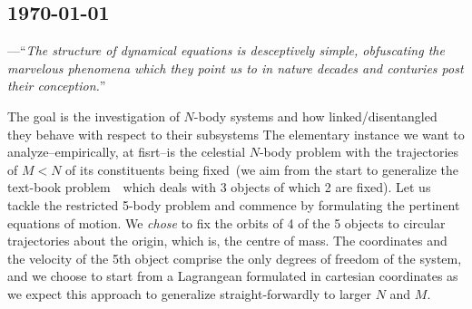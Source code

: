 \documentclass[]{article}
\newcommand{\tqt}[1]{\begin{flushleft}---\textquotedblleft\textit{#1}\textquotedblright\par\end{flushleft}}
\begin{document}
\begin{paracol}{2}

\subsection*{\small \today}
\tqt{The structure of dynamical equations is desceptively simple, obfuscating the marvelous phenomena
which they point us to in nature decades and conturies post their conception.}

\begin{tasks}
    \task The goal is the investigation of $N$-body systems and how linked/disentangled they behave with respect to
    their subsystems
    \task The elementary instance we want to analyze--empirically, at fisrt--is the celestial $N$-body
    problem with the trajectories of $M<N$ of its constituents being fixed~(we aim from the start to
    generalize the text-book problem~\cite{Schmid1990,Geiges_2016}~which deals with 3 objects of which 2 are fixed).
    \task Let us tackle the restricted 5-body problem and commence by formulating the pertinent equations of motion.
    We \emph{chose} to fix the orbits of 4 of the 5 objects to circular trajectories about the origin, which is,
    the centre of mass.
    \task The coordinates and the velocity of the 5th object comprise the only degrees of freedom of the system,
    and we choose to start from a Lagrangean formulated in cartesian coordinates as we expect this approach to
    generalize straight-forwardly to larger $N$ and $M$.
\end{tasks}

\switchcolumn

\begin{tasks}
    \task
\end{tasks}
\end{paracol}
\end{document}
